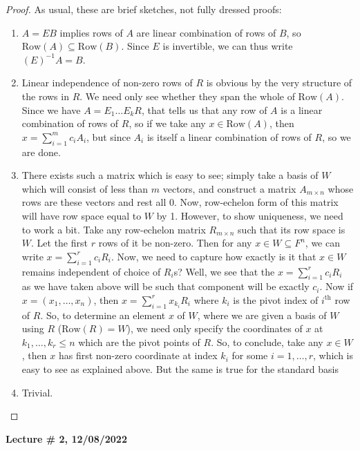 \documentclass[letterpaper,11pt,twoside]{article}
\theoremstyle{definition}
\theoremstyle{definition}
\theoremstyle{definition}
\theoremstyle{definition}
\theoremstyle{definition}
\theoremstyle{definition}
\theoremstyle{remark}
\theoremstyle{definition}
\newcommand{\newlecture}[2]{\begin{center}
    \textbf{Lecture \# #1, #2}
\end{center}}
\newcommand{\inv}[1]{\left(#1\right)^{-1}}
\newcommand{\row}[1]{\text{Row}\left(#1\right)}
\begin{document}
	\begin{proof}
	        As usual, these are brief sketches, not fully dressed proofs:
            \begin{enumerate}
                \item {$A= EB$ implies rows of $A$ are linear combination of rows of $B$, so $\row{A} \subseteq \row{B}$. Since $E$ is invertible, we can thus write $\inv{E} A = B$.}
                \item {Linear independence of non-zero rows of $R$ is obvious by the very structure of the rows in $R$. We need only see whether they span the whole of $\row{A}$. Since we have $A = E_1\dots E_k R$, that tells us that any row of $A$ is a linear combination of rows of $R$, so if we take any $x \in \row{A}$, then $x = \sum_{i=1}^m c_iA_i$, but since $A_i$ is itself a linear combination of rows of $R$, so we are done.}
                \item {There exists such a matrix which is easy to see; simply take a basis of $W$ which will consist of less than $m$ vectors, and construct a matrix $A_{m\times n}$ whose rows are these vectors and rest all 0. Now, row-echelon form of this matrix will have row space equal to $W$ by 1. However, to show uniqueness, we need to work a bit. Take any row-echelon matrix $R_{m\times n}$ such that its row space is $W$. Let the first $r$ rows of it be non-zero. Then for any $x\in W \subseteq F^n$, we can write $x = \sum_{i=1}^r c_i R_i$. Now, we need to capture how exactly is it that $x\in W$ remains independent of choice of $R_i$s? Well, we see that the $x = \sum_{i=1}^r c_iR_i$ as we have taken above will be such that component will be exactly $c_i$. Now if $x = (x_1,\dots,x_n)$, then $x = \sum_{i=1}^rx_{k_i}R_{i}$ where $k_i$ is the pivot index of $i^{\text{th}}$ row of $R$. So, to determine an element $x$ of $W$, where we are given a basis of $W$ using $R$ ($\row{R} = W$), we need only specify the coordinates of $x$ at $k_1,\dots,k_r \le n$ which are the pivot points of $R$. So, to conclude, take any $x\in W$, then $x$ has first non-zero coordinate at index $k_i$ for some $i=1,\dots, r$, which is easy to see as explained above. But the same is true for the standard basis }
				\item {Trivial.}
            \end{enumerate}
	\end{proof} 
	
	\newlecture{2}{12/08/2022}
\end{document}
